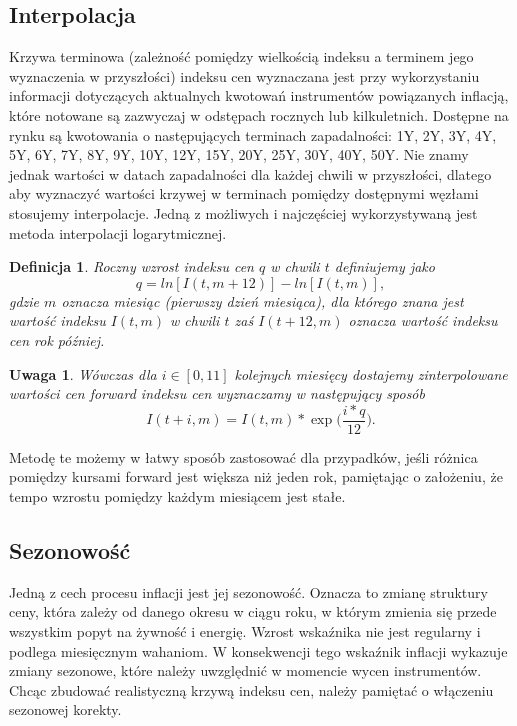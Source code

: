 \documentclass{mini}
\theoremstyle{mythstyle}
\newtheorem{Definicja}{Definicja}[chapter]
\newtheorem{Uwaga}{Uwaga}[chapter]
\begin{document}
	\subsection{Interpolacja}
	
	Krzywa terminowa (zależność pomiędzy wielkością indeksu a terminem jego wyznaczenia w przyszłości) indeksu cen wyznaczana jest przy wykorzystaniu informacji dotyczących aktualnych kwotowań instrumentów powiązanych inflacją, które notowane  są zazwyczaj w odstępach rocznych lub kilkuletnich. Dostępne na rynku są kwotowania o następujących terminach zapadalności: 1Y, 2Y, 3Y, 4Y, 5Y, 6Y, 7Y, 8Y, 9Y, 10Y, 12Y, 15Y, 20Y, 25Y, 30Y, 40Y, 50Y. Nie znamy jednak wartości w datach zapadalności dla każdej chwili w przyszłości, dlatego aby wyznaczyć wartości krzywej w terminach pomiędzy dostępnymi węzłami stosujemy interpolacje. Jedną z możliwych i najczęściej wykorzystywaną jest metoda interpolacji logarytmicznej. \\
	
	\begin{Definicja}
		Roczny wzrost indeksu cen $q$ w chwili $t$ definiujemy jako
		\begin{equation}
		q = ln [I(t,m + 12)] - ln[I(t,m)],
		\end{equation} 
		gdzie $m$ oznacza miesiąc (pierwszy dzień miesiąca), dla którego znana jest wartość indeksu $I(t,m)$ w chwili $t$ zaś $I(t+12,m)$ oznacza wartość indeksu cen rok później.\\
	\end{Definicja}
	
	\begin{Uwaga}
		Wówczas dla $i \in [0,11]$ kolejnych miesięcy dostajemy zinterpolowane wartości cen forward indeksu cen wyznaczamy w następujący sposób
		\begin{equation}
		I(t+i,m) = I(t,m) * \exp\bigg(\frac{i*q}{12}\bigg).
		\end{equation}
	\end{Uwaga}
	
	Metodę te możemy w łatwy sposób zastosować dla przypadków, jeśli różnica pomiędzy kursami forward jest większa niż jeden rok, pamiętając o założeniu, że tempo wzrostu pomiędzy każdym miesiącem jest stałe.
	
	\subsection{Sezonowość}
	
	Jedną z cech procesu inflacji jest jej sezonowość. Oznacza to zmianę struktury ceny, która zależy od danego okresu w ciągu roku, w którym zmienia się przede wszystkim popyt na żywność i energię. Wzrost wskaźnika nie jest regularny i podlega miesięcznym wahaniom. W konsekwencji tego wskaźnik inflacji wykazuje zmiany sezonowe, które należy uwzględnić w momencie wycen instrumentów. Chcąc zbudować realistyczną krzywą indeksu cen, należy pamiętać o włączeniu sezonowej korekty.
\end{document}
